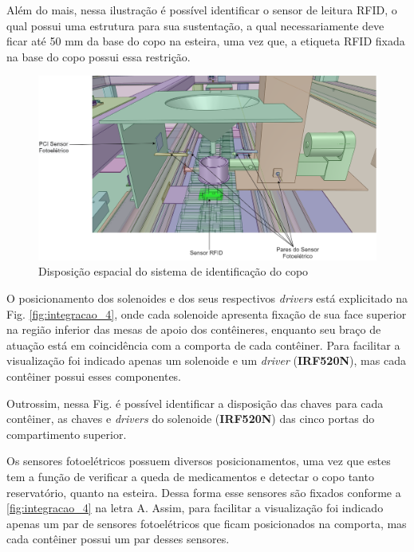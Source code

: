     \hspace{5cm}
    
    Além do mais, nessa ilustração é possível identificar o sensor de leitura RFID, o qual possui uma estrutura para sua sustentação, a qual necessariamente deve ficar até 50 mm da base do copo na esteira, uma vez que, a etiqueta RFID fixada na base do copo possui essa restrição.  
    
    \begin{figure}[H]
        \centering
        \includegraphics[width=1\textwidth]{figuras/integracao/integracao_5.png} 
        \caption{Disposição espacial do sistema de identificação do copo}
        \label{fig:integracao_5}
    \end{figure}
    
    
    O posicionamento dos solenoides e dos seus respectivos \textit{drivers} está explicitado na Fig. \ref{fig:integracao_4}, onde cada solenoide apresenta fixação de sua face superior na região inferior das mesas de apoio dos contêineres, enquanto seu braço de atuação está em coincidência com a comporta de cada contêiner. Para facilitar a visualização foi indicado apenas um solenoide e um \textit{driver} (\textbf{IRF520N}), mas cada contêiner possui esses componentes. 
    
    Outrossim, nessa Fig. é possível identificar a disposição das chaves para cada contêiner, as chaves e \textit{drivers} do solenoide (\textbf{IRF520N}) das cinco portas do compartimento superior.
     
    Os sensores fotoelétricos possuem diversos posicionamentos, uma vez que estes tem a função de verificar a queda de medicamentos e detectar o copo tanto reservatório, quanto na esteira. Dessa forma esse sensores são fixados conforme a \ref{fig:integracao_4} na letra A. Assim, para facilitar a visualização foi indicado apenas um par de sensores fotoelétricos que ficam posicionados na comporta, mas cada contêiner possui um par desses sensores. 
    
